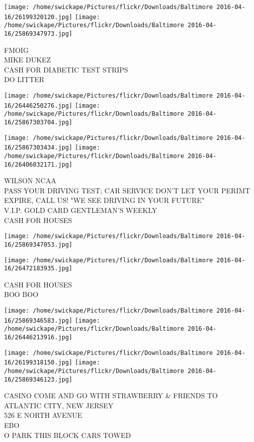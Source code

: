 \documentclass[10pt,letterpaper]{article}
\begin{document}
\texttt{[image: /home/swickape/Pictures/flickr/Downloads/Baltimore 2016-04-16/26199320120.jpg]}
\texttt{[image: /home/swickape/Pictures/flickr/Downloads/Baltimore 2016-04-16/25869347973.jpg]}

FMOIG\\
MIKE DUKEZ\\
CASH FOR DIABETIC TEST STRIPS\\
DO LITTER
\pagebreak

\texttt{[image: /home/swickape/Pictures/flickr/Downloads/Baltimore 2016-04-16/26446250276.jpg]}
\texttt{[image: /home/swickape/Pictures/flickr/Downloads/Baltimore 2016-04-16/25867303704.jpg]}

\texttt{[image: /home/swickape/Pictures/flickr/Downloads/Baltimore 2016-04-16/25867303434.jpg]}
\texttt{[image: /home/swickape/Pictures/flickr/Downloads/Baltimore 2016-04-16/26406032171.jpg]}

WILSON NCAA\\
PASS YOUR DRIVING TEST; CAR SERVICE DON'T LET YOUR PERIMT EXPIRE, CALL US!  "WE SEE DRIVING IN YOUR FUTURE"\\
V.I.P. GOLD CARD GENTLEMAN'S WEEKLY\\
CASH FOR HOUSES
\pagebreak

\texttt{[image: /home/swickape/Pictures/flickr/Downloads/Baltimore 2016-04-16/25869347053.jpg]}

\vspace{0.25in}
\texttt{[image: /home/swickape/Pictures/flickr/Downloads/Baltimore 2016-04-16/26472183935.jpg]}

CASH FOR HOUSES\\
BOO BOO
\pagebreak

\texttt{[image: /home/swickape/Pictures/flickr/Downloads/Baltimore 2016-04-16/25869346583.jpg]}
\texttt{[image: /home/swickape/Pictures/flickr/Downloads/Baltimore 2016-04-16/26446213916.jpg]}

\texttt{[image: /home/swickape/Pictures/flickr/Downloads/Baltimore 2016-04-16/26199318150.jpg]}
\texttt{[image: /home/swickape/Pictures/flickr/Downloads/Baltimore 2016-04-16/25869346123.jpg]}

CASINO COME AND GO WITH STRAWBERRY \& FRIENDS TO ATLANTIC CITY, NEW JERSEY\\
526 E NORTH AVENUE\\
EBO\\
O PARK THIS BLOCK CARS TOWED
\pagebreak
\end{document}
